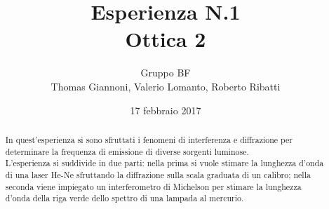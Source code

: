 \documentclass[11pt,a4paper]{article}
\author{Gruppo BF \\ \smallskip Thomas Giannoni, Valerio Lomanto, Roberto Ribatti}
\title{Esperienza N.1 \\Ottica 2}
\date{17 febbraio 2017}
\begin{document}
\maketitle

\begin{abstract}
In quest'esperienza si sono sfruttati i fenomeni di interferenza e diffrazione per determinare la frequenza di emissione di diverse sorgenti luminose.
\\L'esperienza si suddivide in due parti: nella prima si vuole stimare
la lunghezza d'onda di una laser He-Ne sfruttando la diffrazione sulla scala
graduata di un calibro; nella seconda viene impiegato un interferometro di
Michelson per stimare la lunghezza d'onda della riga verde dello
spettro di una lampada al mercurio.
\end{abstract}









\end{document}

